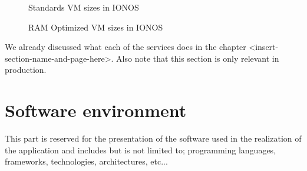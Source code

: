 \begin{figure}[H]
    \centering
    \caption{Standards VM sizes in IONOS}
    \label{fig:standard-vm-sizes}
\end{figure}

\begin{figure}[H]
    \centering
    \caption{RAM Optimized VM sizes in IONOS}
    \label{fig:ram-optimized-vm-sizes}
\end{figure}

We already discussed what each of the services does in the chapter <insert-section-name-and-page-here>.
Also note that this section is only relevant in production.

\section{Software environment}
This part is reserved for the presentation of the software used in the realization of the application and includes but is not limited to; programming languages, frameworks, technologies, architectures, etc...

